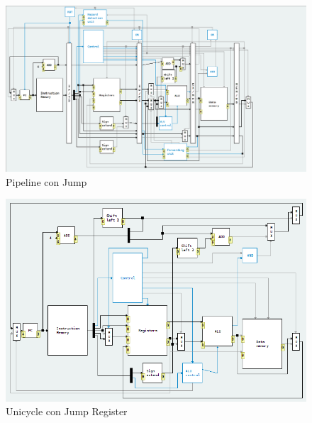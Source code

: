 \documentclass[11pt,a4paper, spanish]{article}
\begin{document}
\begin{figure}
\begin{center}
\includegraphics[width=\textwidth,height=\textheight,keepaspectratio]{img/pipeline_con_jump.png}
\caption{Pipeline con Jump}
\end{center}
\end{figure}

\begin{figure}
\begin{center}
\includegraphics[width=\textwidth,height=\textheight,keepaspectratio]{img/unicycle_jr.png}
\caption{Unicycle con Jump Register}
\end{center}
\end{figure}
\end{document}
